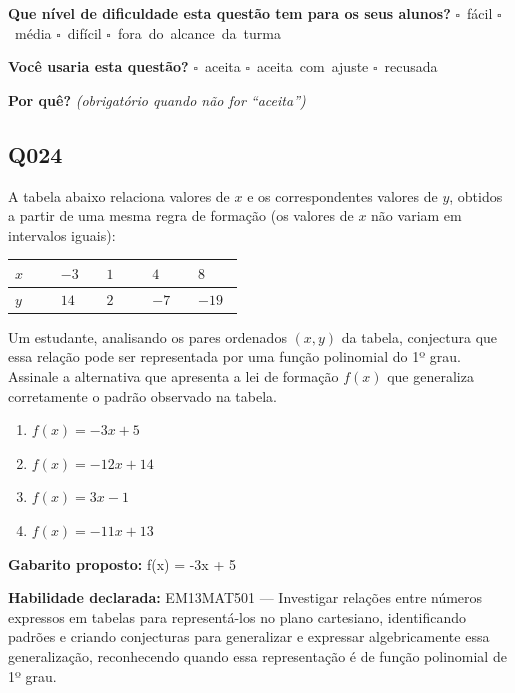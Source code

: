 \documentclass[11pt,a4paper]{article}
\begin{document}
\textbf{Que nível de dificuldade esta questão tem para os seus alunos?}\quad
\mbox{$\square$~fácil} \quad \mbox{$\square$~média} \quad
\mbox{$\square$~difícil} \quad \mbox{$\square$~fora do alcance da turma}

\textbf{Você usaria esta questão?}\quad
\mbox{$\square$~aceita} \quad \mbox{$\square$~aceita com ajuste} \quad
\mbox{$\square$~recusada}

\textbf{Por quê?} \emph{(obrigatório quando não for ``aceita'')}

\underline{\hspace{\linewidth}}

\underline{\hspace{\linewidth}}
\vspace{0.6em}

\begin{samepage}
\subsection*{Q024}
A tabela abaixo relaciona valores de $x$ e os correspondentes valores de $y$, obtidos a partir de uma mesma regra de formação (os valores de $x$ não variam em intervalos iguais):

\begin{center}
\begin{tabular}{|p{0.172\linewidth}|p{0.172\linewidth}|p{0.172\linewidth}|p{0.172\linewidth}|p{0.172\linewidth}|}
\hline
\textbf{$x$} & \textbf{$-3$} & \textbf{$1$} & \textbf{$4$} & \textbf{$8$} \\
\hline
$y$ & $14$ & $2$ & $-7$ & $-19$ \\
\hline
\end{tabular}
\end{center}

Um estudante, analisando os pares ordenados $(x,y)$ da tabela, conjectura que essa relação pode ser representada por uma função polinomial do 1º grau. Assinale a alternativa que apresenta a lei de formação $f(x)$ que generaliza corretamente o padrão observado na tabela.
\begin{enumerate}[label=(\alph*),nosep,leftmargin=*]
\item $f(x) = -3x + 5$
\item $f(x) = -12x + 14$
\item $f(x) = 3x - 1$
\item $f(x) = -11x + 13$
\end{enumerate}

\textbf{Gabarito proposto:} f(x) = -3x + 5

\textbf{Habilidade declarada:} EM13MAT501 --- Investigar relações entre números expressos em tabelas para representá-los no plano cartesiano, identificando padrões e criando conjecturas para generalizar e expressar algebricamente essa generalização, reconhecendo quando essa representação é de função polinomial de 1º grau.
\end{samepage}
\end{document}
